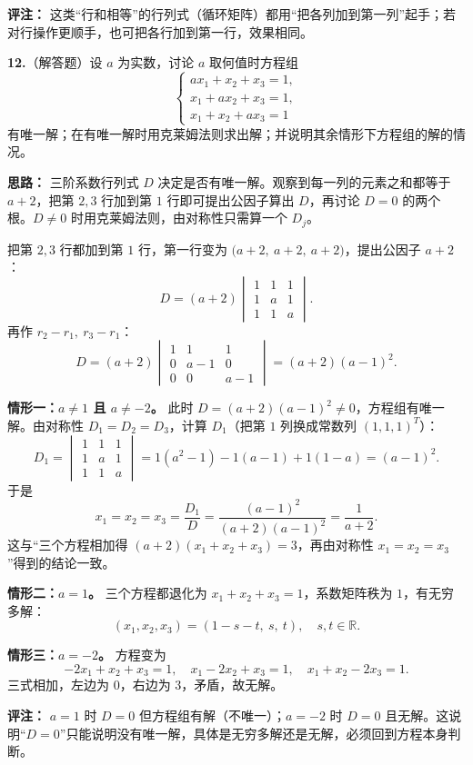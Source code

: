 \textbf{评注：} 这类“行和相等”的行列式（循环矩阵）都用“把各列加到第一列”起手；若对行操作更顺手，也可把各行加到第一行，效果相同。


\else \answerarea[8] \fi%

\textbf{12.}（解答题）设 $a$ 为实数，讨论 $a$ 取何值时方程组
\[
\begin{cases}
ax_1+x_2+x_3=1,\\
x_1+ax_2+x_3=1,\\
x_1+x_2+ax_3=1
\end{cases}
\]
有唯一解；在有唯一解时用克莱姆法则求出解；并说明其余情形下方程组的解的情况。

\ifshowsolutions%
\textbf{思路：} 三阶系数行列式 $D$ 决定是否有唯一解。观察到每一列的元素之和都等于 $a+2$，把第 $2,3$ 行加到第 $1$ 行即可提出公因子算出 $D$，再讨论 $D=0$ 的两个根。$D\neq0$ 时用克莱姆法则，由对称性只需算一个 $D_j$。

把第 $2,3$ 行都加到第 $1$ 行，第一行变为 $\bigl(a+2,\ a+2,\ a+2\bigr)$，提出公因子 $a+2$：
\[
D=(a+2)\begin{vmatrix}
1&1&1\\
1&a&1\\
1&1&a
\end{vmatrix}.
\]
再作 $r_2-r_1,\ r_3-r_1$：
\[
D=(a+2)\begin{vmatrix}
1&1&1\\
0&a-1&0\\
0&0&a-1
\end{vmatrix}=(a+2)(a-1)^{2}.
\]

\textbf{情形一：$a\neq1$ 且 $a\neq-2$。} 此时 $D=(a+2)(a-1)^{2}\neq0$，方程组有唯一解。由对称性 $D_1=D_2=D_3$，计算 $D_1$（把第 $1$ 列换成常数列 $(1,1,1)^{T}$）：
\[
D_1=\begin{vmatrix}
1&1&1\\
1&a&1\\
1&1&a
\end{vmatrix}
=1(a^{2}-1)-1(a-1)+1(1-a)=(a-1)^{2}.
\]
于是
\[
x_1=x_2=x_3=\frac{D_1}{D}=\frac{(a-1)^{2}}{(a+2)(a-1)^{2}}=\frac{1}{a+2}.
\]
这与“三个方程相加得 $(a+2)(x_1+x_2+x_3)=3$，再由对称性 $x_1=x_2=x_3$”得到的结论一致。

\textbf{情形二：$a=1$。} 三个方程都退化为 $x_1+x_2+x_3=1$，系数矩阵秩为 $1$，有无穷多解：
\[
(x_1,x_2,x_3)=(1-s-t,\ s,\ t),\quad s,t\in\mathbb{R}.
\]

\textbf{情形三：$a=-2$。} 方程变为
\[
-2x_1+x_2+x_3=1,\quad x_1-2x_2+x_3=1,\quad x_1+x_2-2x_3=1 .
\]
三式相加，左边为 $0$，右边为 $3$，矛盾，故无解。

\textbf{评注：} $a=1$ 时 $D=0$ 但方程组有解（不唯一）；$a=-2$ 时 $D=0$ 且无解。这说明“$D=0$”只能说明没有唯一解，具体是无穷多解还是无解，必须回到方程本身判断。


\else \answerarea[10] \fi%
